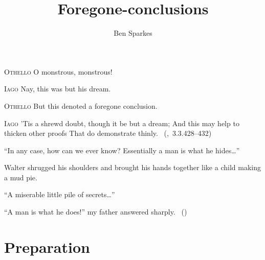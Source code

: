 \documentclass[10pt]{report}
\title{
  Foregone-conclusions
}
\author{Ben Sparkes}
\renewenvironment{quote}
  {\list{}{\rightmargin=.0325\textwidth \leftmargin=.0325\textwidth}%
   \item\relax}
  {\endlist}
\begin{document}
\nocite{Lewis:1973aa}


\maketitle

\begin{quote}
  \textsc{Othello} O monstrous, monstrous!

  \textsc{Iago}\phantom{O monstrous, monstrous! Nay,} Nay, this was but his dream.

  \textsc{Othello} But this denoted a foregone conclusion.

  \textsc{Iago} 'Tis a shrewd doubt, though it be but a dream;\newline
  And this may help to thicken other proofs\newline
  That do demonstrate thinly.\newline
  \mbox{ }\hfill\mbox{(, 3.3.428--432)}
\end{quote}

\vfill

\begin{quote}
  ``In any case, how can we ever know? Essentially a man is what he hides\dots''

  Walter shrugged his shoulders and brought his hands together like a child making a mud pie.

  ``A miserable little pile of secrets\dots''

  ``A man is what he does!'' my father answered sharply.\newline
  \mbox{ }\hfill\mbox{(\cite[20]{Malraux:1968aa})}
\end{quote}

\tableofcontents

\newpage

\setcounter{chapter}{-1}

%

% 



\part{Preparation}
\label{part:prep}




\end{document}
